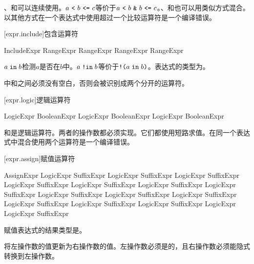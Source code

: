 \pnum
\tcode{<}、\tcode{<=}和\tcode{==}可以连续使用。$a\ \tcode{<}\ b\ \tcode{<=}\ c$等价于$a\ \tcode{<}\ b\ \tcode{\&}\ b\ \tcode{<=}\ c$。\tcode{>}、\tcode{>=}和\tcode{==}也可以用类似方式混合。以其他方式在一个表达式中使用超过一个比较运算符是一个编译错误。

[expr.include]{包含运算符}

\begin{bnf}{IncludeExpr}
    RangeExpr  RangeExpr \br
    RangeExpr  RangeExpr
\end{bnf}

\pnum
$a \mathrel{\texttt{in}} b$检测$a$是否在$b$中。$a \mathrel{\texttt{!in}} b$等价于$\texttt{!(}a \mathrel{\texttt{in}} b\texttt{)}$。表达式的类型为。

\pnum
\enternote {}中\tcode{!}和之间必须没有空白，否则会被识别成两个分开的运算符。\exitnote

[expr.logic]{逻辑运算符}

\begin{bnf}{LogicExpr}
    BooleanExpr \br
    LogicExpr \terminal{\&} BooleanExpr \br
    LogicExpr \terminal{|} BooleanExpr
\end{bnf}

\pnum
\tcode{\&}和\tcode{|}是逻辑运算符。两者的操作数都必须实现。它们都使用短路求值。在同一个表达式中混合使用两个运算符是一个编译错误。

[expr.assign]{赋值运算符}

\begin{bnf}{AssignExpr}
    LogicExpr \br
    SuffixExpr \terminal{=} LogicExpr \br
    SuffixExpr \terminal{+=} LogicExpr \br
    SuffixExpr \terminal{-=} LogicExpr \br
    SuffixExpr \terminal{*=} LogicExpr \br
    SuffixExpr \terminal{/=} LogicExpr \br
    SuffixExpr \terminal{\%=} LogicExpr \br
    SuffixExpr  LogicExpr \br
    SuffixExpr  LogicExpr \br
    SuffixExpr  LogicExpr \br
    SuffixExpr  LogicExpr \br
    SuffixExpr  LogicExpr \br
    SuffixExpr  LogicExpr \br
    SuffixExpr \terminal{<\~} LogicExpr \br
    LogicExpr \terminal{\~>} SuffixExpr
\end{bnf}

\pnum
赋值表达式的结果类型是。

\pnum
\tcode{=}将左操作数的值更新为右操作数的值。左操作数必须是的，且右操作数必须能隐式转换到左操作数。


